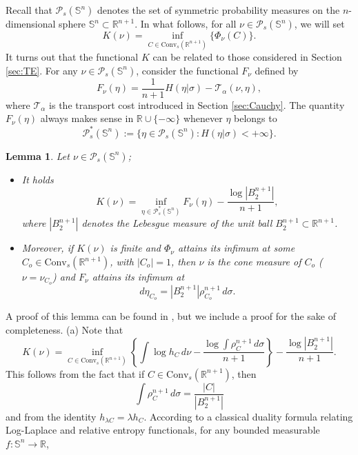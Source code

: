 \documentclass[10pt]{amsart}
\newtheorem{lem}[thm]{Lemma}
\theoremstyle{definition}
\theoremstyle{remark}
\newcommand{\R}{\mathbb{R}}
\newcommand{\Sd}{\mathbb{S}}
\begin{document}
Recall that $\mathcal{P}_s(\Sd^n)$ denotes the set of symmetric probability measures on the $n$-dimensional sphere $\Sd^n \subset \R^{n+1}$. In what follows, for all $\nu \in \mathcal{P}_s(\Sd^n)$, we will set
\[
K(\nu) = \inf_{C \in \mathrm{Conv}_s(\R^{n+1})} \{\Phi_\nu(C)\}.
\]
It turns out that the functional $K$ can be related to those considered in Section \ref{sec:TE}. For any $\nu \in \mathcal{P}_s(\Sd^n)$, consider the functional $F_\nu$ defined by 
\[
F_\nu(\eta) = \frac{1}{n+1}H(\eta | \sigma) - \mathcal{T}_\alpha(\nu,\eta),
\]
where $\mathcal{T}_\alpha$ is the transport cost introduced in Section \ref{sec:Cauchy}. The quantity $F_\nu(\eta)$ always makes sense in $\R\cup\{-\infty\}$ whenever $\eta$ belongs to \[
\mathcal{P}_s^*(\Sd^n):=\{ \eta \in \mathcal{P}_s(\Sd^n) : H(\eta|\sigma)<+\infty\}.
\]

\begin{lem}\label{lem:minimizers} Let $\nu \in \mathcal{P}_s(\Sd^n)$;  
\begin{itemize}
\item[(a)] It holds 
\[
K(\nu) = \inf_{\eta \in \mathcal{P}_s^*(\Sd^n)} F_\nu(\eta)-\frac{\log |B_2^{n+1}|}{n+1},
\]
where $|B_2^{n+1}|$ denotes the Lebesgue measure of the unit ball $B_2^{n+1} \subset \R^{n+1}$. 
\item[(b)] Moreover, if $K(\nu)$ is finite and $\Phi_\nu$ attains its infimum at some $C_o \in \mathrm{Conv}_s(\R^{n+1})$, with $|C_o|=1$, then $\nu$ is the cone measure of $C_o$ ($\nu=\nu_{C_o}$) and $F_\nu$ attains its infimum at 
\[
d\eta_{C_o} = |B_2^{n+1}|\rho_{C_o}^{n+1}\,d\sigma.
\]
\end{itemize}
\end{lem}
A proof of this lemma can be found in \cite{Kol20}, but we include a proof for the sake of completeness.
\proof
(a) Note that
\begin{equation}\label{eq:Kbis}
K(\nu) = \inf_{C\in \mathrm{Conv}_s(\R^{n+1})} \left\{\int \log h_C\,d\nu - \frac{\log \int \rho_C^{n+1}\,d\sigma}{n+1} \right\}-\frac{\log |B_2^{n+1}|}{n+1}.
\end{equation}
This follows from the fact that if $C \in \mathrm{Conv}_s(\R^{n+1})$, then
\[
\int \rho_C^{n+1}\,d\sigma = \frac{|C|}{|B_2^{n+1}|}
\]
and from the identity $h_{\lambda C} = \lambda h_C$.
According to a classical duality formula relating Log-Laplace and relative entropy functionals, for any bounded measurable $f : \Sd^n \to \R$,
\end{document}
